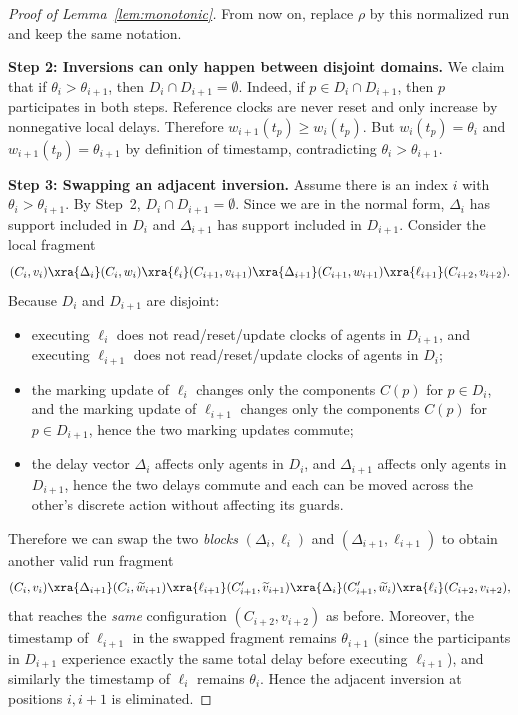 \begin{proof}[Proof of Lemma~\ref{lem:monotonic}]
From now on, replace $\rho$ by this normalized run and keep the same notation.

\medskip\noindent
\textbf{Step 2: Inversions can only happen between disjoint domains.}
We claim that if $\theta_i>\theta_{i+1}$, then $D_i\cap D_{i+1}=\emptyset$.
Indeed, if $p\in D_i\cap D_{i+1}$, then $p$ participates in both steps.
Reference clocks are never reset and only increase by nonnegative local delays.
Therefore $w_{i+1}(t_p)\ge w_i(t_p)$. But $w_i(t_p)=\theta_i$ and
$w_{i+1}(t_p)=\theta_{i+1}$ by definition of timestamp, contradicting
$\theta_i>\theta_{i+1}$.

\medskip\noindent
\textbf{Step 3: Swapping an adjacent inversion.}
Assume there is an index $i$ with $\theta_i>\theta_{i+1}$. By Step~2,
$D_i\cap D_{i+1}=\emptyset$. Since we are in the normal form,
$\Delta_i$ has support included in $D_i$ and $\Delta_{i+1}$ has support included
in $D_{i+1}$. Consider the local fragment
\[
(C_i,v_i)\xra{\Delta_i}(C_i,w_i)\xra{\ell_i}(C_{i+1},v_{i+1})
\xra{\Delta_{i+1}}(C_{i+1},w_{i+1})\xra{\ell_{i+1}}(C_{i+2},v_{i+2}).
\]
Because $D_i$ and $D_{i+1}$ are disjoint:
\begin{itemize}
\item executing $\ell_i$ does not read/reset/update clocks of agents in $D_{i+1}$,
      and executing $\ell_{i+1}$ does not read/reset/update clocks of agents in $D_i$;
\item the marking update of $\ell_i$ changes only the components $C(p)$ for
      $p\in D_i$, and the marking update of $\ell_{i+1}$ changes only the
      components $C(p)$ for $p\in D_{i+1}$, hence the two marking updates commute;
\item the delay vector $\Delta_i$ affects only agents in $D_i$, and $\Delta_{i+1}$
      affects only agents in $D_{i+1}$, hence the two delays commute and each can
      be moved across the other's discrete action without affecting its guards.
\end{itemize}
Therefore we can swap the two \emph{blocks} $(\Delta_i,\ell_i)$ and
$(\Delta_{i+1},\ell_{i+1})$ to obtain another valid run fragment
\[
(C_i,v_i)\xra{\Delta_{i+1}}(C_i,\widetilde w_{i+1})\xra{\ell_{i+1}}(C_{i+1}',\widetilde v_{i+1})
\xra{\Delta_{i}}(C_{i+1}',\widetilde w_{i})\xra{\ell_i}(C_{i+2},v_{i+2}),
\]
that reaches the \emph{same} configuration $(C_{i+2},v_{i+2})$ as before.
Moreover, the timestamp of $\ell_{i+1}$ in the swapped fragment remains
$\theta_{i+1}$ (since the participants in $D_{i+1}$ experience exactly the same
total delay before executing $\ell_{i+1}$), and similarly the timestamp of
$\ell_i$ remains $\theta_i$. Hence the adjacent inversion at positions $i,i+1$
is eliminated.


\end{proof}
